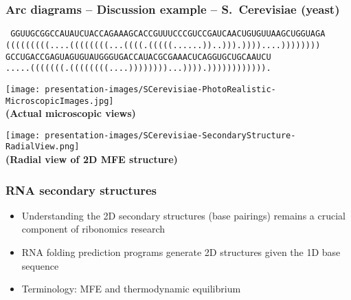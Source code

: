 \documentclass[usenames,svgnames,dvipsnames,11pt]{beamer}
\begin{document}
\begin{frame}[fragile]
\frametitle{Arc diagrams -- Discussion example -- S.~Cerevisiae (yeast)}

\noindent
{\small\tt 
GGUUGCGGCCAUAUCUACCAGAAAGCACCGUUUCCCGUCCGAUCAACUGUGUUAAGCUGGUAGA \\[0.05cm]
{\color{red}(((((((((}....{\color{orange}((((((((}...{\color{yellow!75!black}((((}.{\color{green}(((}{\color{blue}((}......{\color{blue}))}..{\color{green})))}.{\color{yellow!75!black}))))}....{\color{orange}))))))))} \\[0.1cm]
GCCUGACCGAGUAGUGUAUGGGUGACCAUACGCGAAACUCAGGUGCUGCAAUCU \\[0.05cm]
.....{\color{orange}(((((((}.{\color{yellow!75!black}((((((((}....{\color{yellow!75!black}))))))))}...{\color{orange}))))}.{\color{orange})))}{\color{red})))))))))}.
}

\bigskip

\begin{minipage}{0.4\textwidth}
\begin{center}
\texttt{[image: presentation-images/SCerevisiae-PhotoRealistic-MicroscopicImages.jpg]} \\ 
\textbf{(Actual microscopic views)}
\end{center}
\end{minipage}\hfil
\begin{minipage}{0.58\textwidth}
\begin{center}
\texttt{[image: presentation-images/SCerevisiae-SecondaryStructure-RadialView.png]} \\ 
\textbf{(Radial view of 2D MFE structure)} 
\end{center}
\end{minipage}

\end{frame}

\begin{frame}
\frametitle{RNA secondary structures}
\begin{itemize} 

\item Understanding the 2D secondary structures (base pairings) 
      remains a crucial component of ribonomics research
\item RNA folding prediction programs generate 2D structures given the 1D base sequence  
\item Terminology: MFE and thermodynamic equilibrium

\end{itemize}

\end{frame}
\end{document}
